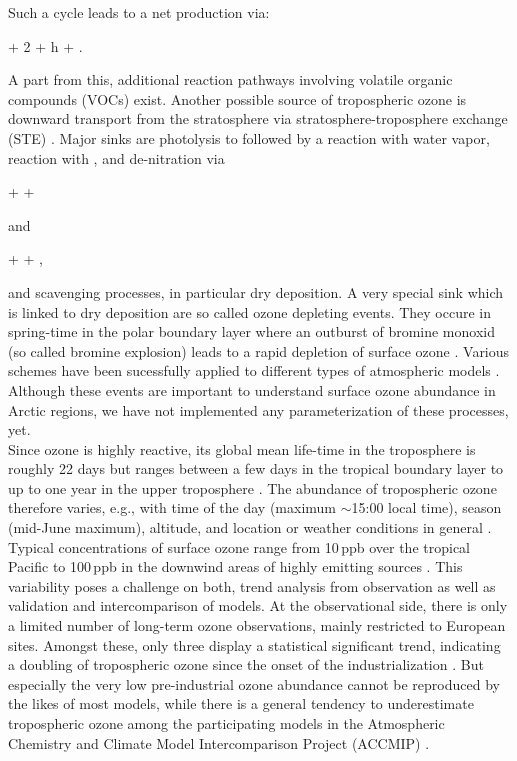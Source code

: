 \documentclass[gmd, manuscript]{copernicus}
\begin{document}
Such a cycle leads to a net production via:
\begin{reaction}
   + 2 + h\nu \rightarrow {} + .
\end{reaction}
A part from this, additional reaction pathways involving volatile organic compounds (VOCs) exist. Another possible source of tropospheric ozone is downward transport from the stratosphere via stratosphere-troposphere exchange (STE) \citep{WMO2014}. Major sinks are photolysis to  followed by a reaction with water vapor, reaction with  \citep{ACP:Seinfeld2006}, and de-nitration via
\begin{reaction}
   +  \rightarrow {} + 
\end{reaction}
and
\begin{reaction}
   +  \rightarrow {} + ,
\end{reaction}
and scavenging processes, in particular dry deposition. A very special sink which is linked to dry deposition are so called ozone depleting events. They occure in spring-time in the polar boundary layer where an outburst of bromine monoxid  (so called bromine explosion) leads to a rapid depletion of surface ozone \citep{JGR:Oltmans1981,GRL:Bottenheim1986,Nat:Barrie1988,JGR:Bottenheim2006}. Various schemes have been sucessfully applied to different types of atmospheric models \citep[e.g.][]{ACP:Yang2010,ACP:Toyota2011,ACP:Toyota2014a,GMD:Falk2018}. Although these events are important to understand surface ozone abundance in Arctic regions, we have not implemented any parameterization of these processes, yet.\\
Since ozone is highly reactive, its global mean life-time in the troposphere is roughly 22 days but ranges between a few days in the tropical boundary layer to up to one year in the upper troposphere \citep{JGR:Stevenson2005,ACP:Young2013}. The abundance of tropospheric ozone therefore varies, e.g., with time of the day (maximum $\sim$15:00 local time), season (mid-June maximum), altitude, and location \citep{ACP:Schnell2015} or weather conditions in general \citep{ACP:Otero2018}. Typical concentrations of surface ozone range from 10\,\unit{ppb} over the tropical Pacific to 100\,\unit{ppb} in the downwind areas of highly emitting sources \citep[Chapter 8]{IPCC2013}. This variability poses a challenge on both, trend analysis from observation as well as validation and intercomparison of models. At the observational side, there is only a limited number of long-term ozone observations, mainly restricted to European sites. Amongst these, only three display a statistical significant trend, indicating a doubling of tropospheric ozone since the onset of the industrialization \citep[Chapter 2]{IPCC2013}. But especially the very low pre-industrial ozone abundance cannot be reproduced by the likes of most models, while there is a general tendency to underestimate tropospheric ozone among the participating models in the Atmospheric Chemistry and Climate Model Intercomparison Project (ACCMIP) \citep[Chapter 8]{IPCC2013}.\\
\end{document}
